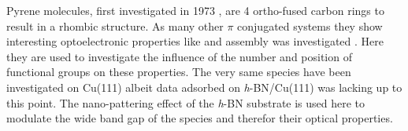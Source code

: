 Pyrene molecules, first investigated in 1973 \cite{khan_electronic_1973}, are 4 ortho-fused carbon rings to result in a rhombic structure. As many other $\pi$ conjugated systems they show interesting optoelectronic properties like \cite{crawford_experimental_2011, lee_enhanced_2012, feng_functionalization_2016, kurata_diarylamino-_2017, maeda_alkynylpyrenes_2006, kurata_diarylamino-_2017} and assembly was investigated \cite{pham_self-assembly_2014, matena_aggregation_2010, della_pia_anomalous_2014, pham_comparing_2016}. Here they are used to investigate the influence of the number and position of functional groups on these properties. The very same species have been investigated on Cu(111) albeit data adsorbed on \textit{h}-BN/Cu(111) was lacking up to this point. The nano-pattering effect of the \textit{h}-BN substrate is used here to modulate the wide band gap of the species and therefor their optical properties.
%


